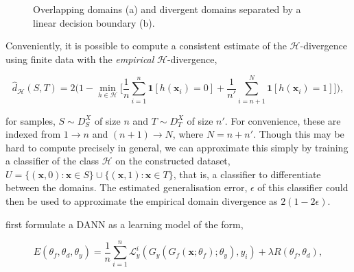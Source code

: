 \begin{figure}[!ht]
{
    }
    \caption{Overlapping domains (a) and divergent domains separated by a linear decision boundary (b).}
    \label{fig:divergence}
\end{figure}


Conveniently, it is possible to compute a consistent estimate of the $\mathcal{H}$-divergence using finite data with the \emph{empirical} $\mathcal{H}$-divergence,

\begin{equation}
\hat{d}_\mathcal{H}(S, T) = 2\Bigg(1 - \min_{h \in \mathcal{H}}\bigg[\frac{1}{n}\sum_{i=1}^n\mathbf{1}[h(\mathbf{x}_i) = 0] + \frac{1}{n'}\sum_{i=n+1}^N\mathbf{1}[h(\mathbf{x}_i) = 1]\bigg]\Bigg),
\end{equation}

for samples, $S \sim D_S^X$ of size $n$ and $T \sim D_T^X$ of size $n'$. For convenience, these are indexed from $1\to n$ and $(n + 1) \to N$, where $N = n + n'$. Though this may be hard to compute precisely in general, we can approximate this simply by training a classifier of the class $\mathcal{H}$ on the constructed dataset, $U = \{(\mathbf{x}, 0) : \mathbf{x} \in S\} \cup \{(\mathbf{x}, 1) : \mathbf{x} \in T\}$, that is, a classifier to differentiate between the domains. The estimated generalisation error, $\epsilon$ of this classifier could then be used to approximate the empirical domain divergence as $2(1 - 2\epsilon)$.

\cite{ajakan2014domain} first formulate a DANN as a learning model of the form,

\begin{equation}
E(\theta_f, \theta_d, \theta_y) = \frac{1}{n}\sum_{i=1}^n\mathcal{L}_y^i(G_y(G_f(\mathbf{x} ; \theta_f) ; \theta_y), y_i) + \lambda R(\theta_f, \theta_d),
\end{equation}

